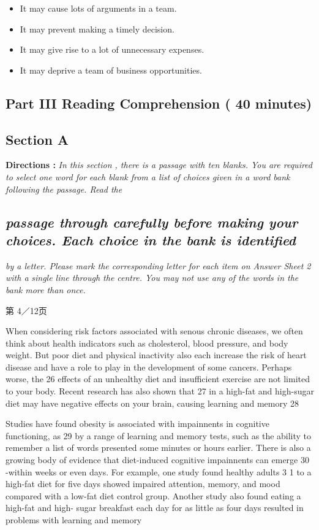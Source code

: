 \documentclass[UTF8,11pt]{ctexart}
\begin{document}
\begin{itemize}[leftmargin=2em,itemsep=.2em,topsep=.4em]\item[A.] It may cause lots of arguments in a team.
\item[B.] It may prevent making a timely decision.
\item[C.] It may give rise to a lot of unnecessary expenses.
\item[D.] It may deprive a team of business opportunities.
\end{itemize}

\subsection*{\textbf{Part III} \textbf{Reading Comprehension} \textbf{( 40 minutes)}}


\subsection*{\textbf{Section A}}


\textbf{Directions : }\textit{In this section , there is a passage with ten blanks. You are required to select one word for} \textit{each blank from a list of choices given in a word bank following the passage. Read the}


\subsection*{\textit{passage through carefully before making your choices. Each choice in the bank is identified}}


\textit{by a letter. Please mark the corresponding letter for each item on Answer Sheet 2 with a} \textit{single line through the centre. You may not use any of the words in the bank more than once.}


第 4／12页


When considering risk factors associated with senous chronic diseases, we often think about health indicators such as cholesterol, blood pressure, and body weight. But poor diet and physical inactivity also each increase the risk of heart disease and have a role to play in the development of some cancers. Perhaps worse, the 26 effects of an unhealthy diet and insufficient exercise are not limited to your body. Recent research has also shown that 27 in a high-fat and high-sugar diet may have negative effects on your brain, causing learning and memory 28


Studies have found obesity is associated with impainnents in cognitive functioning, as 29 by a range of learning and memory tests, such as the ability to remember a list of words presented some minutes or hours earlier. There is also a growing body of evidence that diet-induced cognitive impainnents can emerge 30 -within weeks or even days. For example, one study found healthy adults 3 1 to a high-fat diet for five days showed impaired attention, memory, and mood compared with a low-fat diet control group. Another study also found eating a high-fat and high- sugar breakfast each day for as little as four days resulted in problems with learning and memory
\end{document}
